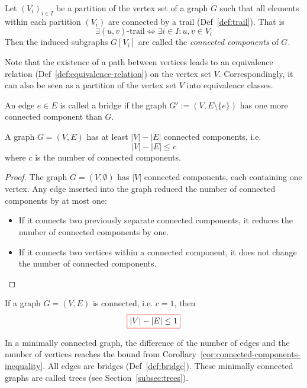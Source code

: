 \begin{definition}\label{def:connected-components}
Let \((V_i)_{i \in I}\) be a partition of the vertex set of a graph \(G\) such that all elements within each partition \((V_i)\) are connected by a trail (Def~\ref{def:trail}).
That is
\[
\exists \text{$(u,v)$-trail} \iff \exists i \in I: u,v \in V_i
\]
Then the induced subgraphs \(G[V_i]\) are called the \emph{connected components} of \(G\).
\end{definition}
Note that the existence of a path between vertices leads to an equivalence relation (Def~\ref{def:equivalence-relation}) on the vertex set \(V\).
Correspondingly, it can also be seen as a partition of the vertex set \(V\) into equivalence classes.

\begin{definition}[Bridge]\label{def:bridge}
An edge \(e\in E\) is called a bridge if the graph \(G' := (V,E\setminus\{e\})\) has one more connected component than \(G\).
\end{definition}

\begin{theorem}\label{thm:connected-components-inequality}
A graph \(G = (V,E)\) has at least \(|V| - |E|\) connected components, i.e.
\[
  |V| - |E| \leq c
\]
where \(c\) is the number of connected components.
\end{theorem}
\begin{proof}
  The graph \(G = (V,\emptyset)\) has \(|V|\) connected components, each containing one vertex.
  Any edge inserted into the graph reduced the number of connected components by at most one:
  \begin{itemize}
  \item If it connects two previously separate connected components, it reduces the number of connected components by one.
  \item If it connects two vertices within a connected component, it does not change the number of connected components. \qedhere
  \end{itemize}
\end{proof}

\begin{corollary}
  \label{cor:connected-components-inequality}
  If a graph \(G = (V,E)\) is connected, i.e. \(c=1\), then
  \[\fcolorbox{red}{white}{$\displaystyle
    |V| - |E| \leq 1
    $} \qedhere
  \]
\end{corollary}

In a minimally connected graph, the diﬀerence of the number of edges and the number of vertices reaches the bound from Corollary~\ref{cor:connected-components-inequality}.
All edges are bridges (Def~\ref{def:bridge}).
These minimally connected graphs are called trees (see Section~\ref{subsec:trees}).


